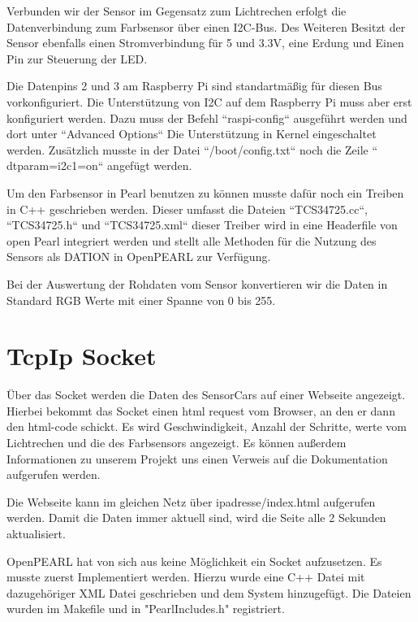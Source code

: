 Verbunden wir der Sensor im Gegensatz zum Lichtrechen erfolgt die Datenverbindung zum Farbsensor über einen I2C-Bus. Des Weiteren Besitzt der Sensor ebenfalls einen Stromverbindung für 5 und 3.3V, eine Erdung und Einen Pin zur Steuerung der LED.

Die Datenpins 2 und 3 am Raspberry Pi sind standartmäßig für diesen Bus vorkonfiguriert. Die Unterstützung von I2C auf dem Raspberry Pi muss aber erst konfiguriert werden. Dazu muss der Befehl “raspi-config“ ausgeführt werden und dort unter “Advanced Options“ Die Unterstützung in Kernel eingeschaltet werden. Zusätzlich musste in der Datei “/boot/config.txt“ noch die Zeile “ dtparam=i2c1=on“ angefügt werden.

Um den Farbsensor in Pearl benutzen zu können musste dafür noch ein Treiben in C++ geschrieben werden. Dieser umfasst die Dateien “TCS34725.cc“, “TCS34725.h“ und “TCS34725.xml“ dieser Treiber wird in eine Headerfile von open Pearl integriert werden und stellt alle Methoden für die Nutzung des Sensors als DATION in OpenPEARL zur Verfügung.

Bei der Auswertung der Rohdaten vom Sensor konvertieren wir die Daten in Standard RGB Werte mit einer Spanne von 0 bis 255.

\section{TcpIp Socket}
Über das Socket werden die Daten des SensorCars auf einer Webseite angezeigt. Hierbei bekommt das Socket einen html request vom Browser, an den er dann den html-code schickt. Es wird Geschwindigkeit, Anzahl der Schritte, werte vom Lichtrechen und die des Farbsensors angezeigt. Es können außerdem Informationen zu unserem Projekt uns einen Verweis auf die Dokumentation aufgerufen werden. 

Die Webseite kann im gleichen Netz über ipadresse/index.html aufgerufen werden. Damit die Daten immer aktuell sind, wird die Seite alle 2 Sekunden aktualisiert.

OpenPEARL hat von sich aus keine Möglichkeit ein Socket aufzusetzen. Es musste zuerst Implementiert werden. Hierzu wurde eine C++ Datei mit dazugehöriger XML Datei geschrieben und dem System hinzugefügt. Die Dateien wurden im Makefile und in "PearlIncludes.h" registriert. 
